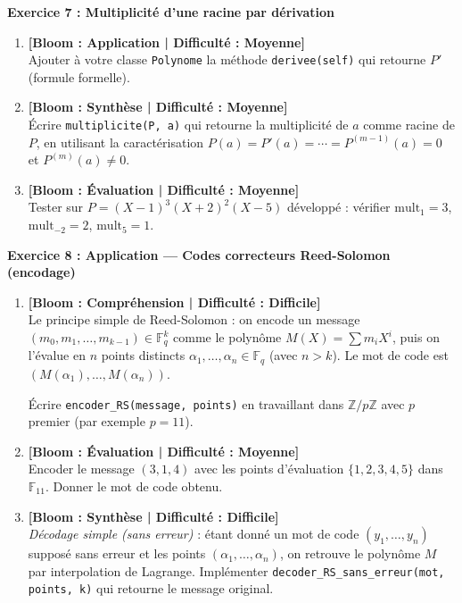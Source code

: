 \documentclass[12pt,a4paper]{report}
\theoremstyle{definition}
\theoremstyle{remark}
\begin{document}
\noindent\textbf{Exercice 7 : Multiplicité d'une racine par dérivation}
\begin{enumerate}
    \item \textbf{[Bloom : Application | Difficulté : Moyenne]} \\
    Ajouter à votre classe \texttt{Polynome} la méthode \texttt{derivee(self)} qui retourne $P'$ (formule formelle).
    \item \textbf{[Bloom : Synthèse | Difficulté : Moyenne]} \\
    Écrire \texttt{multiplicite(P, a)} qui retourne la multiplicité de $a$ comme racine de $P$, en utilisant la caractérisation $P(a) = P'(a) = \cdots = P^{(m-1)}(a) = 0$ et $P^{(m)}(a) \neq 0$.
    \item \textbf{[Bloom : Évaluation | Difficulté : Moyenne]} \\
    Tester sur $P = (X - 1)^3 (X + 2)^2 (X - 5)$ développé : vérifier $\mathrm{mult}_1 = 3$, $\mathrm{mult}_{-2} = 2$, $\mathrm{mult}_5 = 1$.
\end{enumerate}

\vspace{0.3cm}

\noindent\textbf{Exercice 8 : Application --- Codes correcteurs Reed-Solomon (encodage)}
\begin{enumerate}
    \item \textbf{[Bloom : Compréhension | Difficulté : Difficile]} \\
    Le principe simple de Reed-Solomon : on encode un message $(m_0, m_1, \dots, m_{k-1}) \in \mathbb{F}_q^k$ comme le polynôme $M(X) = \sum m_i X^i$, puis on l'évalue en $n$ points distincts $\alpha_1, \dots, \alpha_n \in \mathbb{F}_q$ (avec $n > k$). Le mot de code est $(M(\alpha_1), \dots, M(\alpha_n))$.

    Écrire \texttt{encoder\_RS(message, points)} en travaillant dans $\mathbb{Z}/p\mathbb{Z}$ avec $p$ premier (par exemple $p = 11$).
    \item \textbf{[Bloom : Évaluation | Difficulté : Moyenne]} \\
    Encoder le message $(3, 1, 4)$ avec les points d'évaluation $\{1, 2, 3, 4, 5\}$ dans $\mathbb{F}_{11}$. Donner le mot de code obtenu.
    \item \textbf{[Bloom : Synthèse | Difficulté : Difficile]} \\
    \emph{Décodage simple (sans erreur)} : étant donné un mot de code $(y_1, \dots, y_n)$ supposé sans erreur et les points $(\alpha_1, \dots, \alpha_n)$, on retrouve le polynôme $M$ par interpolation de Lagrange. Implémenter \texttt{decoder\_RS\_sans\_erreur(mot, points, k)} qui retourne le message original.
\end{enumerate}
\end{document}
